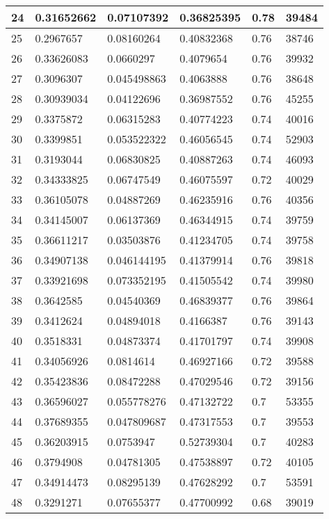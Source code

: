 \begin{longtable}{|l|l|l|l|l|l|}
24 & 0.31652662 & 0.07107392 & 0.36825395 & 0.78 & 39484 \\ \hline 
25 & 0.2967657 & 0.08160264 & 0.40832368 & 0.76 & 38746 \\ \hline 
26 & 0.33626083 & 0.0660297 & 0.4079654 & 0.76 & 39932 \\ \hline 
27 & 0.3096307 & 0.045498863 & 0.4063888 & 0.76 & 38648 \\ \hline 
28 & 0.30939034 & 0.04122696 & 0.36987552 & 0.76 & 45255 \\ \hline 
29 & 0.3375872 & 0.06315283 & 0.40774223 & 0.74 & 40016 \\ \hline 
30 & 0.3399851 & 0.053522322 & 0.46056545 & 0.74 & 52903 \\ \hline 
31 & 0.3193044 & 0.06830825 & 0.40887263 & 0.74 & 46093 \\ \hline 
32 & 0.34333825 & 0.06747549 & 0.46075597 & 0.72 & 40029 \\ \hline 
33 & 0.36105078 & 0.04887269 & 0.46235916 & 0.76 & 40356 \\ \hline 
34 & 0.34145007 & 0.06137369 & 0.46344915 & 0.74 & 39759 \\ \hline 
35 & 0.36611217 & 0.03503876 & 0.41234705 & 0.74 & 39758 \\ \hline 
36 & 0.34907138 & 0.046144195 & 0.41379914 & 0.76 & 39818 \\ \hline 
37 & 0.33921698 & 0.073352195 & 0.41505542 & 0.74 & 39980 \\ \hline 
38 & 0.3642585 & 0.04540369 & 0.46839377 & 0.76 & 39864 \\ \hline 
39 & 0.3412624 & 0.04894018 & 0.4166387 & 0.76 & 39143 \\ \hline 
40 & 0.3518331 & 0.04873374 & 0.41701797 & 0.74 & 39908 \\ \hline 
41 & 0.34056926 & 0.0814614 & 0.46927166 & 0.72 & 39588 \\ \hline 
42 & 0.35423836 & 0.08472288 & 0.47029546 & 0.72 & 39156 \\ \hline 
43 & 0.36596027 & 0.055778276 & 0.47132722 & 0.7 & 53355 \\ \hline 
44 & 0.37689355 & 0.047809687 & 0.47317553 & 0.7 & 39553 \\ \hline 
45 & 0.36203915 & 0.0753947 & 0.52739304 & 0.7 & 40283 \\ \hline 
46 & 0.3794908 & 0.04781305 & 0.47538897 & 0.72 & 40105 \\ \hline 
47 & 0.34914473 & 0.08295139 & 0.47628292 & 0.7 & 53591 \\ \hline 
48 & 0.3291271 & 0.07655377 & 0.47700992 & 0.68 & 39019 \\ \hline 

\end{longtable}
